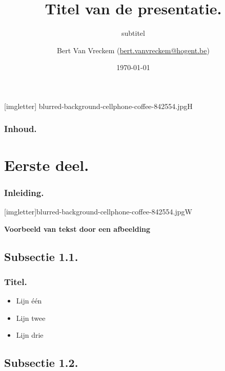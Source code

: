 \documentclass[aspectratio=169]{beamer}
\title[Korte titel]{Titel van de presentatie.}
\subtitle{subtitel}
\author[BVV]{Bert {Van Vreckem} (\href{mailto:bert.vanvreckem@hogent.be}{bert.vanvreckem@hogent.be})}
\date{\today}
\begin{document}
{
[imgletter]
    {blurred-background-cellphone-coffee-842554.jpg}{H}

\begin{frame}
  \maketitle
\end{frame}
}

\begin{frame}
  \frametitle{Inhoud.}

  \tableofcontents
\end{frame}

\section{Eerste deel.}

\begin{frame}
  \frametitle{Inleiding.}

  \lipsum*[2]
\end{frame}

{
[imgletter]{blurred-background-cellphone-coffee-842554.jpg}{W}

\begin{frame}

{\huge \textbf{Voorbeeld van tekst door een afbeelding}}

\end{frame}
}

\subsection{Subsectie 1.1.}

\begin{frame}
  \frametitle{Titel.}

  \begin{itemize}
  \item Lijn één
  \item Lijn twee
  \item Lijn drie
  \end{itemize}
\end{frame}

\subsection{Subsectie 1.2.}
\end{document}
